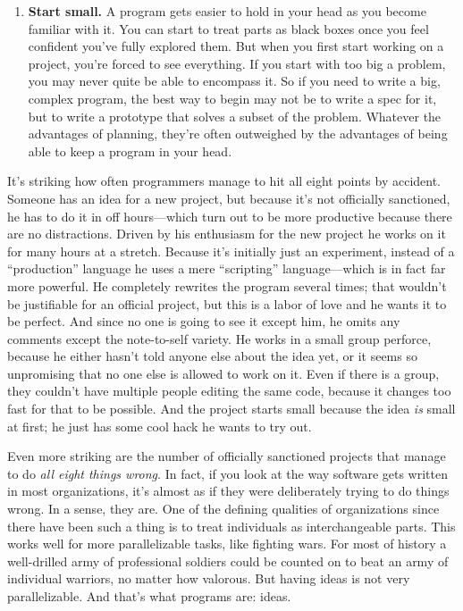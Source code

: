 \begin{enumerate}
  If you want to put several people to work on a project, divide it into
  components and give each to one person.
\item
  \textbf{Start small.} A program gets easier to hold in your head as
  you become familiar with it. You can start to treat parts as black
  boxes once you feel confident you've fully explored them. But when you
  first start working on a project, you're forced to see everything. If
  you start with too big a problem, you may never quite be able to
  encompass it. So if you need to write a big, complex program, the best
  way to begin may not be to write a spec for it, but to write a
  prototype that solves a subset of the problem. Whatever the advantages
  of planning, they're often outweighed by the advantages of being able
  to keep a program in your head.
\end{enumerate}

It's striking how often programmers manage to hit all eight points by
accident. Someone has an idea for a new project, but because it's not
officially sanctioned, he has to do it in off hours---which turn out to
be more productive because there are no distractions. Driven by his
enthusiasm for the new project he works on it for many hours at a
stretch. Because it's initially just an experiment, instead of a
``production'' language he uses a mere ``scripting'' language---which is
in fact far more powerful. He completely rewrites the program several
times; that wouldn't be justifiable for an official project, but this is
a labor of love and he wants it to be perfect. And since no one is going
to see it except him, he omits any comments except the note-to-self
variety. He works in a small group perforce, because he either hasn't
told anyone else about the idea yet, or it seems so unpromising that no
one else is allowed to work on it. Even if there is a group, they
couldn't have multiple people editing the same code, because it changes
too fast for that to be possible. And the project starts small because
the idea \emph{is} small at first; he just has some cool hack he wants
to try out.

Even more striking are the number of officially sanctioned projects that
manage to do \emph{all eight things wrong}. In fact, if you look at the
way software gets written in most organizations, it's almost as if they
were deliberately trying to do things wrong. In a sense, they are. One
of the defining qualities of organizations since there have been such a
thing is to treat individuals as interchangeable parts. This works well
for more parallelizable tasks, like fighting wars. For most of history a
well-drilled army of professional soldiers could be counted on to beat
an army of individual warriors, no matter how valorous. But having ideas
is not very parallelizable. And that's what programs are: ideas.

